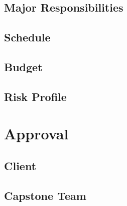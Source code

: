 \documentclass[10pt,letterpaper]{article}
\begin{document}
\subsection{Major Responsibilities}


\subsection{Schedule}


\subsection{Budget}\label{budget}


\subsection{Risk Profile}\label{risk}


\clearpage
\section{Approval}




\subsection*{Client}


\subsection*{Capstone Team}


\clearpage
{}



\end{document}
